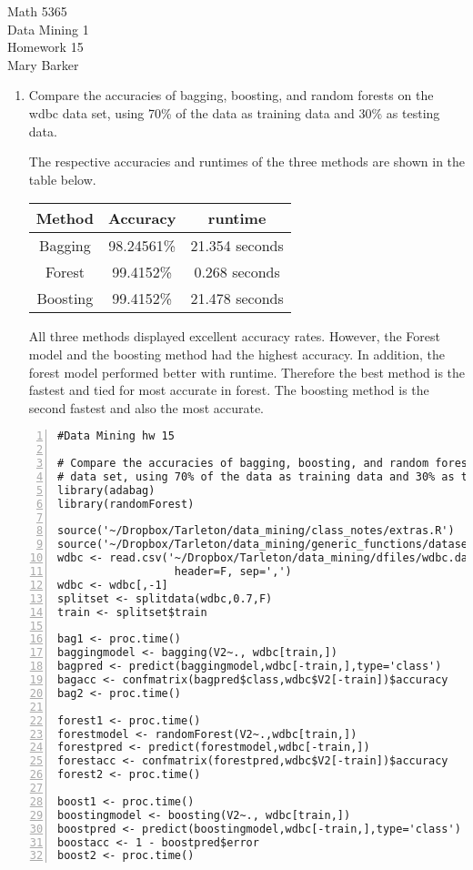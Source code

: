 \documentclass[11pt]{article}
\begin{document}
\noindent\large{Math 5365}\\
\large{Data Mining 1}\\
\large{Homework 15}\\
\large{Mary Barker}
\doublespace
\begin{enumerate}
\item 
 Compare the accuracies of bagging, boosting, and random forests on the wdbc 
 data set, using 70\% of the data as training data and 30\% as testing data.

 The respective accuracies and runtimes of the three methods are shown in the table below.

\begin{center}
\begin{tabular}{c|c|c}
Method & Accuracy & runtime \tabularnewline\hline
Bagging & 98.24561\% & 21.354 seconds\\
Forest & 99.4152\% & 0.268 seconds \\
Boosting & 99.4152\% & 21.478 seconds
\\ \hline
\end{tabular}
\end{center}

All three methods displayed excellent accuracy rates. However, the Forest model and the 
boosting method had the highest accuracy. In addition, the forest model performed better 
with runtime. Therefore the best method is the fastest and tied for most accurate in 
forest. The boosting method is the second fastest and also the most accurate. 
\end{enumerate}
\begin{Verbatim}[numbers=left]
#Data Mining hw 15

# Compare the accuracies of bagging, boosting, and random forests on the wdbc 
# data set, using 70% of the data as training data and 30% as testing data.
library(adabag)
library(randomForest)

source('~/Dropbox/Tarleton/data_mining/class_notes/extras.R')
source('~/Dropbox/Tarleton/data_mining/generic_functions/dataset_ops.R')
wdbc <- read.csv('~/Dropbox/Tarleton/data_mining/dfiles/wdbc.data', 
                  header=F, sep=',')
wdbc <- wdbc[,-1]
splitset <- splitdata(wdbc,0.7,F)
train <- splitset$train

bag1 <- proc.time()
baggingmodel <- bagging(V2~., wdbc[train,])
bagpred <- predict(baggingmodel,wdbc[-train,],type='class')
bagacc <- confmatrix(bagpred$class,wdbc$V2[-train])$accuracy
bag2 <- proc.time()

forest1 <- proc.time()
forestmodel <- randomForest(V2~.,wdbc[train,])
forestpred <- predict(forestmodel,wdbc[-train,])
forestacc <- confmatrix(forestpred,wdbc$V2[-train])$accuracy
forest2 <- proc.time()

boost1 <- proc.time()
boostingmodel <- boosting(V2~., wdbc[train,])
boostpred <- predict(boostingmodel,wdbc[-train,],type='class')
boostacc <- 1 - boostpred$error
boost2 <- proc.time()
\end{Verbatim}
\end{document}
